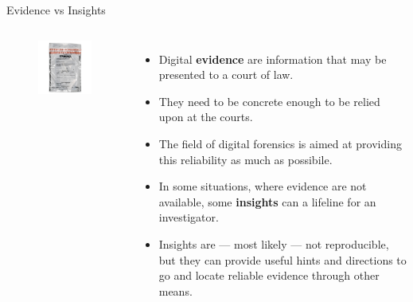 \documentclass[handout]{beamer}
\begin{document}
\begin{frame}{Evidence vs Insights}  

\begin{columns}


	\begin{figure}
		\includegraphics[width=150pt]{figures/digital-evidence.jpg}
	\end{figure}


	\begin{itemize}
	\footnotesize
	\item Digital \textbf{evidence} are information that may be presented to a court of law.
		\vspace{10pt}
	\item They need to be concrete enough to be relied upon at the courts.
		\vspace{10pt}
	\item The field of digital forensics is aimed at providing this reliability as much as possibile.
		\vspace{10pt}
	\item In some situations, where evidence are not available, some \textbf{insights} can a lifeline for an investigator. 
		\vspace{10pt}
	\item Insights are --- most likely --- not reproducible, but they can provide useful hints and directions to go and locate reliable evidence through other means. 
	\end{itemize}

\end{columns}

\end{frame}
\end{document}

